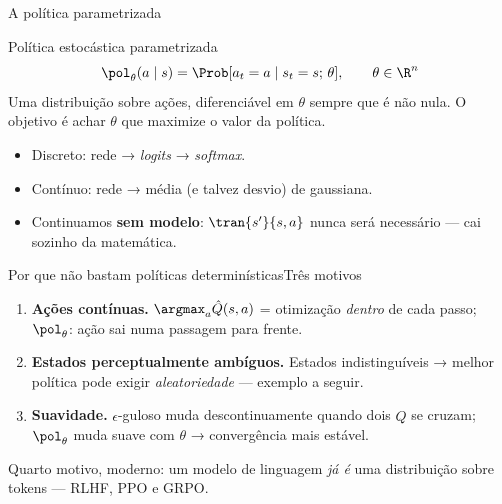\documentclass[aspectratio=169, 11pt]{beamer}
\newcommand{\thv}{\theta}                       %
\newcommand{\polth}{\pol_{\thv}}                %
\newcommand{\Qhat}{\hat{Q}}
\begin{document}
\begin{frame}{A política parametrizada}

  \begin{defbox}{Política estocástica parametrizada}
    \[
      \polth(a \mid s) = \Prob[a_t = a \mid s_t = s;\, \thv],
      \qquad \thv \in \R^{n}
    \]
    Uma distribuição sobre ações, diferenciável em $\thv$ sempre que é não
    nula. O objetivo é achar $\thv$ que maximize o valor da política.
  \end{defbox}

  \begin{itemize}\setlength{\itemsep}{0.4ex}
    \item Discreto: rede → \emph{logits} → \emph{softmax}.
    \item Contínuo: rede → média (e talvez desvio) de gaussiana.
    \item Continuamos \textbf{sem modelo}: $\tran{s'}{s,a}$ nunca será
      necessário --- cai sozinho da matemática.
  \end{itemize}
\end{frame}

\begin{frame}{Por que não bastam políticas determinísticas}{Três motivos}

  \begin{enumerate}\setlength{\itemsep}{0.55ex}
    \item \textbf{Ações contínuas.} $\argmax_a \Qhat(s,a)$ = otimização
      \emph{dentro} de cada passo; $\polth$: ação sai numa passagem para
      frente.
    \item \textbf{Estados perceptualmente ambíguos.} Estados indistinguíveis →
      melhor política pode exigir \emph{aleatoriedade} --- exemplo a seguir.
    \item \textbf{Suavidade.} $\epsilon$-guloso muda descontinuamente quando
      dois $\Qhat$ se cruzam; $\polth$ muda suave com $\thv$ → convergência
      mais estável.
  \end{enumerate}

  \begin{ideiabox}
    Quarto motivo, moderno: um modelo de linguagem \emph{já é} uma distribuição
    sobre tokens --- RLHF, PPO e GRPO.
  \end{ideiabox}
\end{frame}
\end{document}
